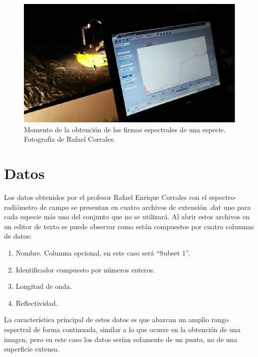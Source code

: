 \begin{figure}
	\centering
	\includegraphics[width=0.8\linewidth]{./Imagenes/Curva_espectral.eps}
	\caption[Obtención de firmas]{Momento de la obtención de las firmas espectrales de una especie. Fotografía de Rafael Corrales.}
	\label{fig:curva_espectral}
\end{figure}

\section{Datos}
\label{sec:datos}
Los datos obtenidos por el profesor Rafael Enrique Corrales con el espectro-radiómetro de campo se presentan en cuatro archivos de extensión .dat uno para cada especie más uno del conjunto que no se utilizará. Al abrir estos archivos en un editor de texto se puede observar como están compuestos por 
cuatro columnas de datos:

\begin{enumerate}
	\item Nombre. Columna opcional, en este caso será ``Subset 1''.
	\item Identificador compuesto por números enteros.
	\item Longitud de onda.
	\item Reflectividad.
\end{enumerate}

La característica principal de estos datos es que abarcan un amplio rango espectral de forma continuada, similar a lo que ocurre en la obtención de una imagen, pero en este caso los datos serían solamente de un punto, no de una superficie extensa.\Sep


